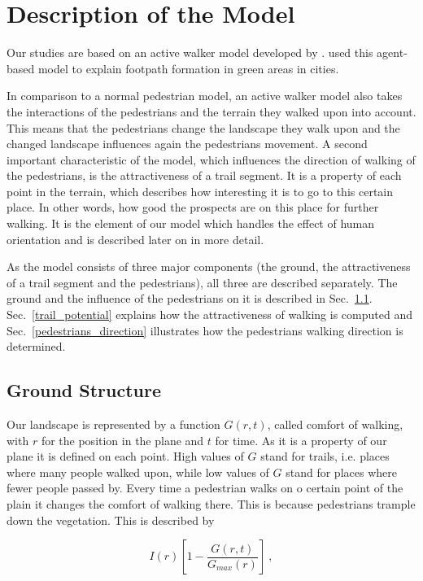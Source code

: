 \section{Description of the Model}

Our studies are based on an active walker model developed by \cite{helbing:1997}. \cite{helbing:1997} used this agent-based model to explain footpath formation in green areas in cities.

In comparison to a normal pedestrian model, an active walker model also takes the interactions of the pedestrians and the terrain they walked upon into account. This means that the pedestrians change the landscape they walk upon and the changed landscape influences again the pedestrians movement. A second important characteristic of the model, which influences the direction of walking of the pedestrians, is the attractiveness of a trail segment. It is a property of each point in the terrain, which describes how interesting it is to go to this certain place. In other words, how good the prospects are on this place for further walking. It is the element of our model which handles the effect of human orientation and is described later on in more detail.

As the model consists of three major components (the ground, the attractiveness of a trail segment and the pedestrians), all three are described separately. The ground and the influence of the pedestrians on it is described in Sec.\ \ref{ground_structure}. Sec.\ \ref{trail_potential} explains how the attractiveness of walking is computed and Sec.\ \ref{pedestrians_direction} illustrates how the pedestrians walking direction is determined.

\subsection{Ground Structure}
\label{ground_structure}

Our landscape is represented by a function $G(r,t)$, called comfort of walking, with $r$ for the position in the plane and $t$ for time. As it is a property of our plane it is defined on each point. High values of $G$ stand for trails, i.e. places where many people walked upon, while low values of $G$ stand for places where fewer people passed by. Every time a pedestrian walks on o certain point of the plain it changes the comfort of walking there. This is because pedestrians trample down the vegetation. This is described by

\begin{equation}
\label{trample_down}
I(r)[1-\frac{G(r,t)}{G_{max}(r)}]\ ,
\end{equation}

